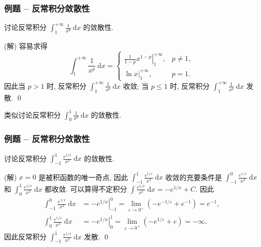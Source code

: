 
\begin{frame}
\frametitle{例题 -- 反常积分敛散性}

\begin{eg}
讨论反常积分 $\int_1^{+\infty} \frac{1}{x^p} ~ \mathrm{d} x$ 的敛散性.
\end{eg}

\pause
\vspace{0.5em}

\startproof[bg=yellow, fg=red](解)
容易求得
\[
\int_1^{+\infty} \frac{1}{x^p} ~ \mathrm{d} x = \begin{cases}
\left. \frac{1}{1 - p} x^{1 - p} \right|_1^{+\infty}, & p \neq 1, \\[6pt]
\left. \ln x \right|_1^{+\infty}, & p = 1.
\end{cases}
\]
因此当 $p > 1$ 时, 反常积分 $\int_1^{+\infty} \frac{1}{x^p} ~ \mathrm{d} x$ 收敛; 当 $p \leqslant 1$ 时, 反常积分 $\int_1^{+\infty} \frac{1}{x^p} ~ \mathrm{d} x$ 发散.
\qed

\pause
\vspace{0.5em}

\begin{question}
类似讨论反常积分 $\int_0^1 \frac{1}{x^p} ~ \mathrm{d} x$ 的敛散性.
\end{question}

\end{frame}


\begin{frame}
\frametitle{例题 -- 反常积分敛散性}

\begin{eg}
讨论反常积分 $\int_{-1}^1 \frac{e^{1/x}}{x^2} ~ \mathrm{d} x$ 的敛散性.
\end{eg}

\pause
\vspace{0.5em}

\startproof[bg=yellow, fg=red](解)
$x = 0$ 是被积函数的唯一奇点, 因此 $\int_{-1}^1 \frac{e^{1/x}}{x^2} ~ \mathrm{d} x$ 收敛的充要条件是 $\int_{-1}^0 \frac{e^{1/x}}{x^2} ~ \mathrm{d} x$ 和 $\int_0^1 \frac{e^{1/x}}{x^2} ~ \mathrm{d} x$ 都收敛. 可以算得不定积分 $\int \frac{e^{1/x}}{x^2} ~ \mathrm{d} x = -e^{1/x} + C$. 因此
\begin{align*}
\int_{-1}^0 \frac{e^{1/x}}{x^2} ~ \mathrm{d} x & = \left. -e^{1/x} \right|_{-1}^0 = \lim_{\varepsilon \to 0^+} \left(-e^{-1/\varepsilon} + e^{-1}\right) = e^{-1}, \\
\int_0^1 \frac{e^{1/x}}{x^2} ~ \mathrm{d} x & = \left. -e^{1/x} \right|_0^1 = \lim_{\varepsilon \to 0^+} \left(-e^{1/\varepsilon} + e\right) = -\infty.
\end{align*}
因此反常积分 $\int_{-1}^1 \frac{e^{1/x}}{x^2} ~ \mathrm{d} x$ 发散.
\qed

\end{frame}

